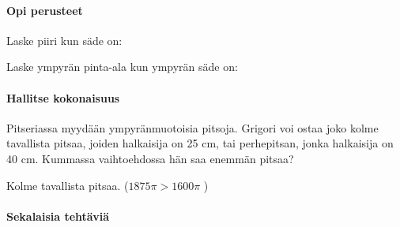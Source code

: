\begin{tehtavasivu}

\paragraph*{Opi perusteet}

\begin{tehtava}
Laske piiri kun säde on:
\begin{vastaus}
\end{vastaus}
\end{tehtava}

\begin{tehtava}
Laske ympyrän pinta-ala kun ympyrän säde on:

\begin{vastaus}
\end{vastaus}
\end{tehtava}


\paragraph*{Hallitse kokonaisuus}

\begin{tehtava}
Pitseriassa myydään ympyränmuotoisia pitsoja. Grigori voi ostaa joko kolme tavallista pitsaa, joiden halkaisija on 25 cm, tai perhepitsan, jonka halkaisija on 40 cm. Kummassa vaihtoehdossa hän saa enemmän pitsaa?

\begin{vastaus}
Kolme tavallista pitsaa. ($1875 \pi > 1600 \pi$ )
\end{vastaus}
\end{tehtava}

\paragraph*{Sekalaisia tehtäviä}

\end{tehtavasivu}
